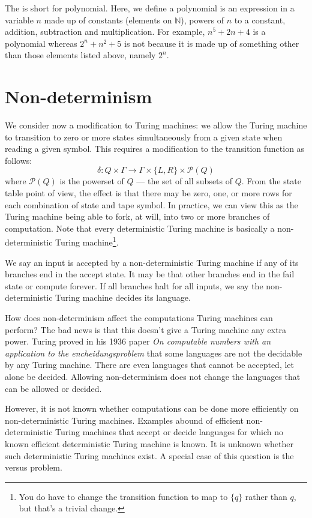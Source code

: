   The  is short for polynomial.
  Here, we define a polynomial is an expression in a variable \( n \) made up of constants (elements on \( \mathbb{N}\)), powers of \( n \) to a constant, addition, subtraction and multiplication.
  For example, \( n^5 + 2n + 4 \) is a polynomial whereas \( 2^n + n^2 + 5 \) is not because it is made up of something other than those elements listed above, namely \( 2^n \).



\section{Non-determinism}
  \label{sect:nondet}
  We consider now a modification to Turing machines: we allow the Turing machine to transition to zero or more states simultaneously from a given state when reading a given symbol.
  This requires a modification to the transition function as follows:
   \[ \delta: Q \times \Gamma \rightarrow \Gamma \times \{ L, R \} \times \mathcal{P}(Q) \]
   where \( \mathcal{P}(Q) \) is the powerset of \( Q \) --- the set of all subsets of \( Q \).
  From the state table point of view, the effect is that there may be zero, one, or more rows for each combination of state and tape symbol.
  In practice, we can view this as the Turing machine being able to fork, at will, into two or more branches of computation.
  Note that every deterministic Turing machine is basically a non-deterministic Turing machine\footnote{You do have to change the transition function to map to \( \{ q \} \) rather than \( q \), but that's a trivial change.}.

  We say an input is accepted by a non-deterministic Turing machine if any of its branches end in the accept state.
  It may be that other branches end in the fail state or compute forever.
  If all branches halt for all inputs, we say the non-deterministic Turing machine decides its language.

  How does non-determinism affect the computations Turing machines can perform?
  The bad news is that this doesn't give a Turing machine any extra power.
  Turing proved in his 1936 paper \emph{On computable numbers with an application to the encheidungsproblem} that some languages are not the decidable by any Turing machine.
  There are even languages that cannot be accepted, let alone be decided.
  Allowing non-determinism does not change the languages that can be allowed or decided.

  However, it is not known whether computations can be done more efficiently on non-deterministic Turing machines.
  Examples abound of efficient non-deterministic Turing machines that accept or decide languages for which no known efficient deterministic Turing machine is known.
  It is unknown whether such deterministic Turing machines exist.
  A special case of this question is the  versus  problem.


